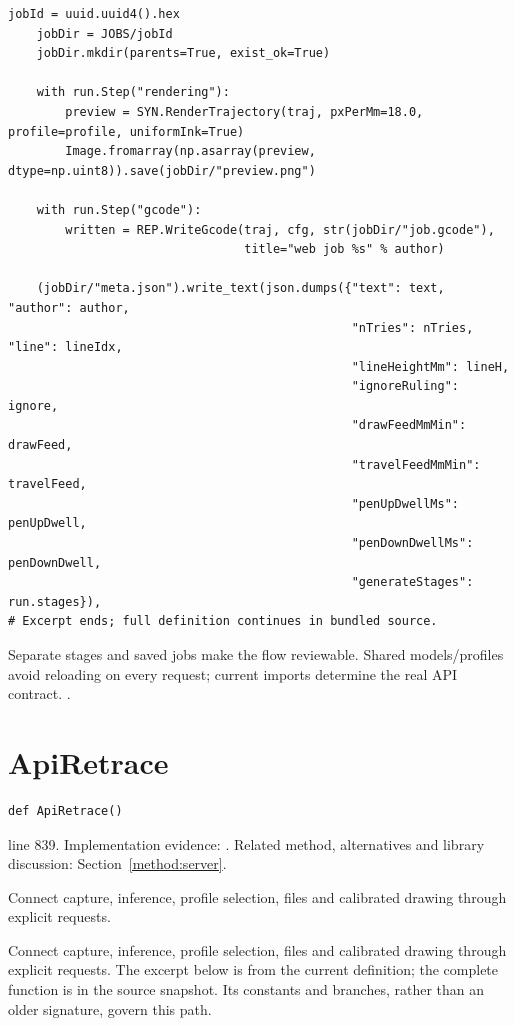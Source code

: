 \begin{lstlisting}[style=plain]
    jobId = uuid.uuid4().hex
    jobDir = JOBS/jobId
    jobDir.mkdir(parents=True, exist_ok=True)

    with run.Step("rendering"):
        preview = SYN.RenderTrajectory(traj, pxPerMm=18.0, profile=profile, uniformInk=True)
        Image.fromarray(np.asarray(preview, dtype=np.uint8)).save(jobDir/"preview.png")

    with run.Step("gcode"):
        written = REP.WriteGcode(traj, cfg, str(jobDir/"job.gcode"),
                                 title="web job %s" % author)

    (jobDir/"meta.json").write_text(json.dumps({"text": text, "author": author,
                                                "nTries": nTries, "line": lineIdx,
                                                "lineHeightMm": lineH,
                                                "ignoreRuling": ignore,
                                                "drawFeedMmMin": drawFeed,
                                                "travelFeedMmMin": travelFeed,
                                                "penUpDwellMs": penUpDwell,
                                                "penDownDwellMs": penDownDwell,
                                                "generateStages": run.stages}),
# Excerpt ends; full definition continues in bundled source.
\end{lstlisting}
Separate stages and saved jobs make the flow reviewable. Shared models/profiles avoid reloading on every request; current imports determine the real API contract. \cite{flaskdocs,pillowops,code2026}.


\section{ApiRetrace}\label{fn:web-server:ApiRetrace}
\begin{lstlisting}[style=sig]
def ApiRetrace()
\end{lstlisting}
 line 839. Implementation evidence: \cite{code2026}. Related method, alternatives and library discussion: Section~\ref{method:server}.


Connect capture, inference, profile selection, files and calibrated drawing through explicit requests.


Connect capture, inference, profile selection, files and calibrated drawing through explicit requests. The excerpt below is from the current definition; the complete function is in the source snapshot. Its constants and branches, rather than an older signature, govern this path.


